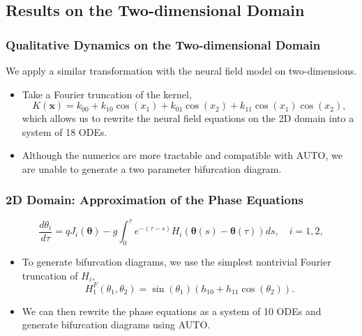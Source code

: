 \documentclass{beamer}
\newcommand{\x}{\mathbf{x}}
\newcommand{\q}{\boldsymbol{\theta}}
\begin{document}
\subsection{Results on the Two-dimensional Domain}

\begin{frame}
\frametitle{Qualitative Dynamics on the Two-dimensional Domain}
We apply a similar transformation with the neural field model on two-dimensions.

\begin{itemize}
 \item<1-> Take a Fourier truncation of the kernel,
\begin{equation*}
 K(\x) = k_{00} + k_{10}\cos(x_1) + k_{01}\cos(x_2) + k_{11}\cos(x_1)\cos(x_2),
\end{equation*}
which allows us to rewrite the neural field equations on the 2D domain into a system of 18 ODEs.
 \item<2-> Although the numerics are more tractable and compatible with AUTO, we are unable to generate a two parameter bifurcation diagram.
\end{itemize}
\end{frame}

\begin{frame}
 \frametitle{2D Domain: Approximation of the Phase Equations}
  \begin{equation*}
\frac{d\theta_i}{d\tau} = qJ_i(\q) -g\int_0^\tau e^{-(\tau-s)} H_i(\q(s)-\q(\tau))ds, \quad i=1,2,
\end{equation*}
\begin{itemize}
 \item<1->  To generate bifurcation diagrams, we use the simplest nontrivial Fourier truncation of $H_i$,
\begin{equation*}
 H^F_1(\theta_1,\theta_2) =  \sin(\theta_1)(h_{10} + h_{11}\cos(\theta_2)).
\end{equation*}
\item<2-> We can then rewrite the phase equations as a system of 10 ODEs and generate bifurcation diagrams using AUTO.
\end{itemize}

\end{frame}

\end{document}
